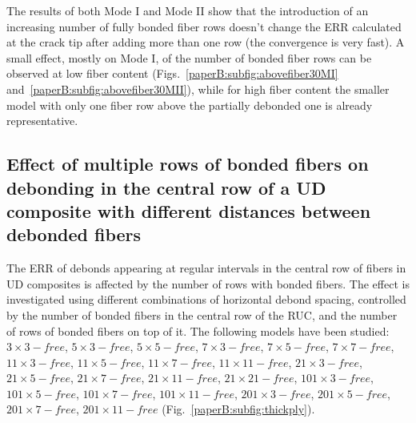 The results of both Mode I and Mode II show that the introduction of an increasing number of fully bonded fiber rows doesn't change the ERR calculated at the crack tip after adding more than one row (the convergence is very fast). A small effect, mostly on Mode I, of the number of bonded fiber rows can be observed at low fiber content (Figs.~\ref{paperB:subfig:abovefiber30MI} and~\ref{paperB:subfig:abovefiber30MII}), while for high fiber content the smaller model with only one fiber row above the partially debonded one is already representative.

\subsection{Effect of multiple rows of bonded fibers on debonding in the central row of a UD composite with different distances between debonded fibers}\label{paperB:subsec:multrow}

The ERR of debonds appearing at regular intervals in the central row of fibers in UD composites is affected by the number of rows with bonded fibers. The effect is investigated using different combinations of horizontal debond spacing, controlled by the number of bonded fibers in the central row of the RUC, and the number of rows of bonded fibers on top of it. The following models have been studied: $3\times 3-free$, $5\times 3-free$, $5\times 5-free$, $7\times 3-free$, $7\times 5-free$, $7\times 7-free$, $11\times 3-free$, $11\times 5-free$, $11\times 7-free$, $11\times 11-free$, $21\times 3-free$, $21\times 5-free$, $21\times 7-free$, $21\times 11-free$, $21\times 21-free$, $101\times 3-free$, $101\times 5-free$, $101\times 7-free$, $101\times 11-free$, $201\times 3-free$, $201\times 5-free$, $201\times 7-free$, $201\times 11-free$  (Fig.~\ref{paperB:subfig:thickply}).

